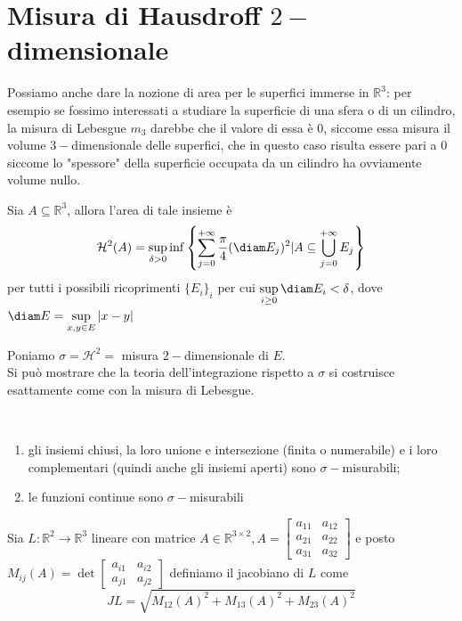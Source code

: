 \section{Misura di Hausdroff $2-$dimensionale}
%
Possiamo anche dare la nozione di area per le superfici immerse in $\mathbb{R}^3$: per esempio se fossimo interessati a studiare la superficie di una sfera o di un cilindro, la misura di Lebesgue $m_3$ darebbe che il valore di essa è $0$, siccome essa misura
il volume $3-$dimensionale delle superfici, che in questo caso risulta essere pari a $0$ siccome lo "spessore" della superficie occupata da un cilindro ha ovviamente volume nullo. \\
%
\vspace{0.5cm}
\begin{definition}[\textcolor{blue}{misura di Hausdroff $2-$dimensionale}]
	Sia $A \subseteq \mathbb{R}^3$, allora l'area di tale insieme è
	$$
		\mathcal{H}^2(A) = \sup_{\delta > 0} \inf \left\{ \sum_{j=0}^{+\infty} \frac{\pi}{4} (\diam E_j)^2 | A \subseteq \bigcup_{j=0}^{+\infty} E_j \right\}
	$$
	per tutti i possibili ricoprimenti $\{ E_i \}_i$ per cui $\sup\limits_{i \geq 0} \diam E_i < \delta$, dove $\diam E = \sup\limits_{x, y \in E} |x-y|$
\end{definition}
%
Poniamo $\sigma=\mathcal{H}^2=$ misura $2-$dimensionale di $E$. \\
Si può mostrare che la teoria dell'integrazione rispetto a $\sigma$ si costruisce esattamente come con la misura di Lebesgue. 
%
\vspace{0.5cm}
\begin{theorem}[\textcolor{blue}{A1}] \hspace{1cm} \\ \vspace{-0.5cm}
	\begin{enumerate}[label=\protect\circled{\arabic*}]
		\item gli insiemi chiusi, la loro unione e intersezione (finita o numerabile) e i loro complementari (quindi anche gli insiemi aperti) sono $\sigma-$misurabili;
		\item le funzioni continue sono $\sigma-$misurabili
	\end{enumerate}
\end{theorem}
%
\vspace{0.5cm}
\begin{definition}[\textcolor{blue}{jacobiano di una funzione non iniettiva}]
Sia $L:\mathbb{R}^2 \to \mathbb{R}^3$ lineare con matrice $A \in \mathbb{R}^{3 \times 2}, A = \begin{bmatrix} a_{11} & a_{12} \\ a_{21} & a_{22} \\ a_{31} & a_{32} \end{bmatrix}$ e posto $M_{ij}(A) = \det \begin{bmatrix} a_{i1} & a_{i2} \\ a_{j1} & a_{j2} \end{bmatrix}$ definiamo
il jacobiano di $L$ come
$$
JL = \sqrt{M_{12}(A)^2 + M_{13}(A)^2 + M_{23}(A)^2}
$$
\end{definition}
